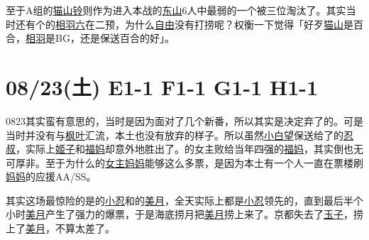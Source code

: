 至于A组的\uline{猫山铃}则作为进入本战的\uline{东山}6人中最弱的一个被三位淘汰了。其实当时还有个的\uline{相羽六}在二预，为什么\uline{自由}没有打捞呢？权衡一下觉得「好歹\uline{猫山}是百合，\uline{相羽}是BG，还是保送百合的好」。

\section{08/23(土) E1-1 F1-1 G1-1 H1-1}


0823其实蛮有意思的，当时是因为面对了几个新番，所以其实是决定弃了的。可是当时并没有与\uline{枫叶}汇流，本土也没有放弃的样子。所以虽然\uline{小白望}保送给了的\uline{忍叔}，实际上\uline{姬子}和\uline{福妈}却意外地胜出了。的女主败给当年四强的\uline{福妈}，其实倒也无可厚非。至于为什么的\uline{女主妈妈}能够这么多票，是因为本土有一个人一直在票楼刷\uline{妈妈}的应援AA/SS。

其实这场最惊险的是的\uline{小忍}和的\uline{美月}，全天实际上都是\uline{小忍}领先的，直到最后半个小时\uline{美月}产生了强力的爆票，于是海底捞月把\uline{美月}捞上来了。京都失去了\uline{玉子}，捞上了\uline{美月}，不算太差了。

